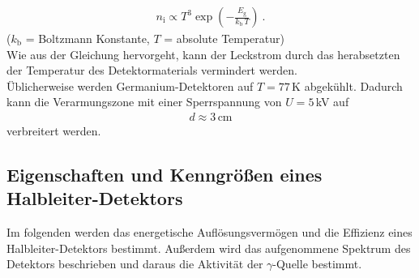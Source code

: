 \begin{align}
	n_\text{i} \propto T^3 \exp\left(-\frac{E_\text{g}}{k_\text{b}\,T} \right) \ .
\end{align}
\hfil {\footnotesize($k_\text{b}$ = Boltzmann Konstante, $T$ = absolute Temperatur)} \hfil \\
Wie aus der Gleichung hervorgeht, kann der Leckstrom durch das herabsetzten der Temperatur des Detektormaterials vermindert werden. \\
Üblicherweise werden Germanium-Detektoren auf $T = 77$\,K abgekühlt. Dadurch kann die Verarmungszone mit einer Sperrspannung von $U = 5$\,kV auf
\begin{align}
	d \approx 3\,\text{cm}
\end{align}
verbreitert werden.



\subsection{Eigenschaften und Kenngrößen eines Halbleiter-Detektors}
Im folgenden werden das energetische Auflösungsvermögen und die Effizienz eines Halbleiter-Detektors bestimmt. Außerdem wird das aufgenommene Spektrum des Detektors beschrieben und daraus die Aktivität der $\gamma$-Quelle bestimmt.



